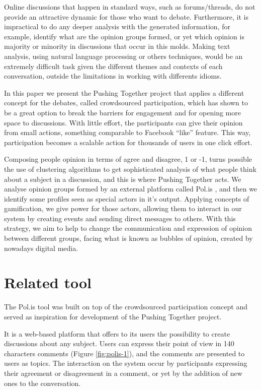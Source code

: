 \documentclass{llncs}
\begin{document}
  Online discussions that happen in standard ways, such as forums/threads, do
not provide an attractive dynamic for those who want to debate. Furthermore, it
is impractical to do any deeper analysis with the generated information, for
example, identify what are the opinion groups formed, or yet which opinion is
majority or minority in discussions that occur in this molds. Making text
analysis, using natural language processing or others techniques, would be an
extremely difficult task given the different themes and contexts of each
conversation, outside the limitations in working with differents idioms.

  In this paper we present the Pushing Together project that applies a
different concept for the debates, called crowdsourced participation, which has
shown to be a great option to break the barriers for engagement and for opening
more space to discussions. With little effort, the participants can give their
opinion from small actions, something comparable to Facebook ``like'' feature.
This way, participation becomes a scalable action for thousands of users in one
click effort.

  Composing people opinion in terms of agree and disagree, 1 or -1, turns
possible the use of clustering algorithms to get sophisticated analysis of what
people think about a subject in a discussion, and this is where Pushing
Together acts. We analyse opinion groups formed by an external platform called
Pol.is \cite{polisSite},
and then we identify some profiles seen as special actors in it's output.
Applying concepts of gamification, we give power for those
actors, allowing them to interact in our system by creating events and
sending direct messages to others. With this strategy, we aim to help to change
the communication and expression of opinion between different groups, facing
what is known as bubbles \cite{polisInTaiwan} of opinion, created by nowadays
digital media.

\section{Related tool}

  The Pol.is tool was built on top of
the crowdsourced participation concept and served as inspiration for
development of the Pushing Together project.

  It is a web-based platform that offers to its users the possibility to
create discussions about any subject. Users can express their point of view in
140 characters comments (Figure \ref{fig:polis-1}), and the comments are presented
to users as topics. The interaction on the system occur by
participants expressing their agreement or disagreement in a comment, or yet by
the addition of new ones to the conversation.
\end{document}
